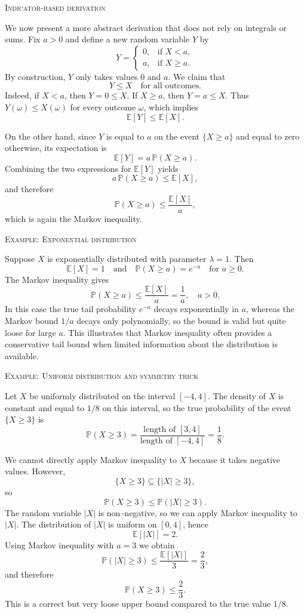\bigskip
\textsc{Indicator-based derivation}

We now present a more abstract derivation that does not rely on integrals or sums.  
Fix \(a > 0\) and define a new random variable \(Y\) by
\[
Y =
\begin{cases}
0, & \text{if } X < a,\\
a, & \text{if } X \ge a.
\end{cases}
\]
By construction, \(Y\) only takes values \(0\) and \(a\).  
We claim that
\[
Y \le X
\quad\text{for all outcomes.}
\]
Indeed, if \(X < a\), then \(Y = 0 \le X\).  
If \(X \ge a\), then \(Y = a \le X\).  
Thus \(Y(\omega) \le X(\omega)\) for every outcome \(\omega\), which implies
\[
\mathbb{E}[Y] \le \mathbb{E}[X].
\]

On the other hand, since \(Y\) is equal to \(a\) on the event \(\{X \ge a\}\) and equal to zero otherwise, its expectation is
\[
\mathbb{E}[Y]
=
a \,\mathbb{P}(X \ge a).
\]
Combining the two expressions for \(\mathbb{E}[Y]\) yields
\[
a \,\mathbb{P}(X \ge a)
\le
\mathbb{E}[X],
\]
and therefore
\[
\mathbb{P}(X \ge a) \le \frac{\mathbb{E}[X]}{a},
\]
which is again the Markov inequality.

\bigskip
\textsc{Example: Exponential distribution}

Suppose \(X\) is exponentially distributed with parameter \(\lambda = 1\).  
Then
\[
\mathbb{E}[X] = 1
\quad\text{and}\quad
\mathbb{P}(X \ge a) = e^{-a}
\quad\text{for } a \ge 0.
\]
The Markov inequality gives
\[
\mathbb{P}(X \ge a) \le \frac{\mathbb{E}[X]}{a} = \frac{1}{a},
\quad a > 0.
\]
In this case the true tail probability \(e^{-a}\) decays exponentially in \(a\), whereas the Markov bound \(1/a\) decays only polynomially, so the bound is valid but quite loose for large \(a\).  
This illustrates that Markov inequality often provides a conservative tail bound when limited information about the distribution is available.

\bigskip
\textsc{Example: Uniform distribution and symmetry trick}

Let \(X\) be uniformly distributed on the interval \([-4,4]\).  
The density of \(X\) is constant and equal to \(1/8\) on this interval, so the true probability of the event \(\{X \ge 3\}\) is
\[
\mathbb{P}(X \ge 3) = \frac{\text{length of }[3,4]}{\text{length of }[-4,4]} = \frac{1}{8}.
\]

We cannot directly apply Markov inequality to \(X\) because it takes negative values.  
However,
\[
\{X \ge 3\} \subseteq \{|X| \ge 3\},
\]
so
\[
\mathbb{P}(X \ge 3) \le \mathbb{P}(|X| \ge 3).
\]
The random variable \(|X|\) is non\,-negative, so we can apply Markov inequality to \(|X|\).  
The distribution of \(|X|\) is uniform on \([0,4]\), hence
\[
\mathbb{E}[|X|] = 2.
\]
Using Markov inequality with \(a = 3\) we obtain
\[
\mathbb{P}(|X| \ge 3) \le \frac{\mathbb{E}[|X|]}{3} = \frac{2}{3},
\]
and therefore
\[
\mathbb{P}(X \ge 3) \le \frac{2}{3}.
\]
This is a correct but very loose upper bound compared to the true value \(1/8\).  

